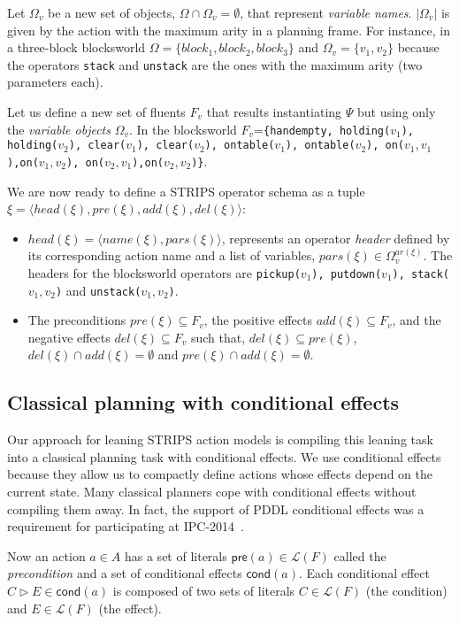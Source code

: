 \documentclass[letterpaper]{article} %
\newcommand{\tup}[1]{{\langle #1 \rangle}}
\newcommand{\pre}{\mathsf{pre}}     %
\newcommand{\cond}{\mathsf{cond}}   %
\begin{document}
Let $\Omega_v$ be a new set of objects, $\Omega\cap\Omega_v=\emptyset$, that represent {\em variable names}. $|\Omega_v|$ is given by the action with the maximum arity in a planning frame. For instance, in a three-block blocksworld $\Omega=\{block_1, block_2, block_3\}$ and $\Omega_v=\{v_1, v_2\}$ because the operators {\small\tt stack} and {\small\tt unstack} are the ones with the maximum arity (two parameters each). 

Let us define a new set of fluents $F_{v}$ that results instantiating $\Psi$ but using only the {\em variable objects} $\Omega_v$. In the blocksworld $F_v$={\small\tt\{handempty, holding($v_1$), holding($v_2$), clear($v_1$), clear($v_2$), ontable($v_1$), ontable($v_2$), on($v_1,v_1$),on($v_1,v_2$), on($v_2,v_1$),on($v_2,v_2$)\}}.

We are now ready to define a STRIPS operator schema as a tuple $\xi=\tup{head(\xi),pre(\xi),add(\xi),del(\xi)}$:
\begin{itemize}
\item $head(\xi)=\tup{name(\xi),pars(\xi)}$, represents an operator {\em header} defined by its corresponding action name and a list of variables, $pars(\xi)\in\Omega_v^{ar(\xi)}$. The headers for the blocksworld operators are {\small\tt pickup($v_1$), putdown($v_1$), stack($v_1,v_2$)} and {\small\tt unstack($v_1,v_2$)}.
\item The preconditions $pre(\xi)\subseteq F_v$, the positive effects $add(\xi)\subseteq F_v$, and the negative effects $del(\xi)\subseteq F_v$ such that, $del(\xi)\subseteq pre(\xi)$, $del(\xi)\cap add(\xi)=\emptyset$ and $pre(\xi)\cap add(\xi)=\emptyset$.
\end{itemize}


\subsection{Classical planning with conditional effects}
Our approach for leaning STRIPS action models is compiling this leaning task into a classical planning task with conditional effects. We use conditional effects because they allow us to compactly define actions whose effects depend on the current state. Many classical planners cope with conditional effects without compiling them away. In fact, the support of PDDL conditional effects was a requirement for participating at IPC-2014~\cite{vallati:IPC:AIM2015}.

Now an action $a\in A$ has a set of literals $\pre(a)\in\mathcal{L}(F)$ called the {\em precondition} and a set of conditional effects $\cond(a)$. Each conditional effect $C\rhd E\in\cond(a)$ is composed of two sets of literals $C\in\mathcal{L}(F)$ (the condition) and $E\in\mathcal{L}(F)$ (the effect).
\end{document}
